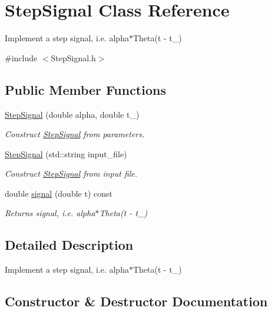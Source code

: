 \hypertarget{classStepSignal}{}\section{Step\+Signal Class Reference}
\label{classStepSignal}


Implement a step signal, i.\+e. alpha$\ast$\+Theta(t -\/ t\+\_)  




{\ttfamily \#include $<$Step\+Signal.\+h$>$}

\subsection*{Public Member Functions}
\begin{DoxyCompactItemize}
\item 
\hyperlink{classStepSignal_a7f9d574831a2114aa0022472d57b7abc}{Step\+Signal} (double alpha, double t\+\_)
\begin{DoxyCompactList}\small\item\em Construct \hyperlink{classStepSignal}{Step\+Signal} from parameters. \end{DoxyCompactList}\item 
\hyperlink{classStepSignal_ac295a21796206a794dbf3c65dad2d75e}{Step\+Signal} (std\+::string input\+\_\+file)
\begin{DoxyCompactList}\small\item\em Construct \hyperlink{classStepSignal}{Step\+Signal} from input file. \end{DoxyCompactList}\item 
double \hyperlink{classStepSignal_a04b7f029bb2b53c9b63003b0d6b4360a}{signal} (double t) const
\begin{DoxyCompactList}\small\item\em Returns signal, i.\+e. alpha$\ast$\+Theta(t -\/ t\+\_) \end{DoxyCompactList}\end{DoxyCompactItemize}


\subsection{Detailed Description}
Implement a step signal, i.\+e. alpha$\ast$\+Theta(t -\/ t\+\_) 

\subsection{Constructor \& Destructor Documentation}
\mbox{\label{classStepSignal_a7f9d574831a2114aa0022472d57b7abc}} 
